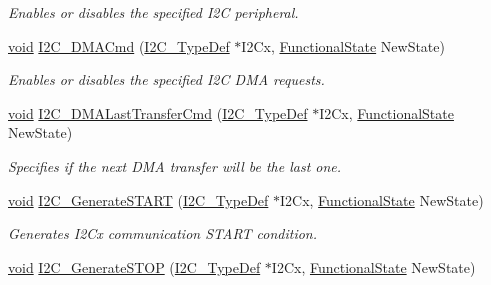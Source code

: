 \begin{DoxyCompactItemize}
\begin{DoxyCompactList}\small\item\em Enables or disables the specified I2C peripheral. \end{DoxyCompactList}\item 
\hyperlink{usb__devapi_8h_afabf60e7f57651d6d595a02c75f07cd0}{void} \hyperlink{group___i2_c___exported___functions_ga38502ce11e5ec923e0f6476aaa35b45c}{I2\+C\+\_\+\+D\+M\+A\+Cmd} (\hyperlink{struct_i2_c___type_def}{I2\+C\+\_\+\+Type\+Def} $\ast$I2\+Cx, \hyperlink{agilefox_2library_2inc_2stm32f10x__type_8h_ac9a7e9a35d2513ec15c3b537aaa4fba1}{Functional\+State} New\+State)
\begin{DoxyCompactList}\small\item\em Enables or disables the specified I2C D\+MA requests. \end{DoxyCompactList}\item 
\hyperlink{usb__devapi_8h_afabf60e7f57651d6d595a02c75f07cd0}{void} \hyperlink{group___i2_c___exported___functions_gab2e994c5681eb6ec7c26a03ffe1de060}{I2\+C\+\_\+\+D\+M\+A\+Last\+Transfer\+Cmd} (\hyperlink{struct_i2_c___type_def}{I2\+C\+\_\+\+Type\+Def} $\ast$I2\+Cx, \hyperlink{agilefox_2library_2inc_2stm32f10x__type_8h_ac9a7e9a35d2513ec15c3b537aaa4fba1}{Functional\+State} New\+State)
\begin{DoxyCompactList}\small\item\em Specifies if the next D\+MA transfer will be the last one. \end{DoxyCompactList}\item 
\hyperlink{usb__devapi_8h_afabf60e7f57651d6d595a02c75f07cd0}{void} \hyperlink{group___i2_c___exported___functions_ga36c522b471588be9779c878222ccb20f}{I2\+C\+\_\+\+Generate\+S\+T\+A\+RT} (\hyperlink{struct_i2_c___type_def}{I2\+C\+\_\+\+Type\+Def} $\ast$I2\+Cx, \hyperlink{agilefox_2library_2inc_2stm32f10x__type_8h_ac9a7e9a35d2513ec15c3b537aaa4fba1}{Functional\+State} New\+State)
\begin{DoxyCompactList}\small\item\em Generates I2\+Cx communication S\+T\+A\+RT condition. \end{DoxyCompactList}\item 
\hyperlink{usb__devapi_8h_afabf60e7f57651d6d595a02c75f07cd0}{void} \hyperlink{group___i2_c___exported___functions_ga5c92cb573ca0ae58cc465e5400246561}{I2\+C\+\_\+\+Generate\+S\+T\+OP} (\hyperlink{struct_i2_c___type_def}{I2\+C\+\_\+\+Type\+Def} $\ast$I2\+Cx, \hyperlink{agilefox_2library_2inc_2stm32f10x__type_8h_ac9a7e9a35d2513ec15c3b537aaa4fba1}{Functional\+State} New\+State)

\end{DoxyCompactItemize}
